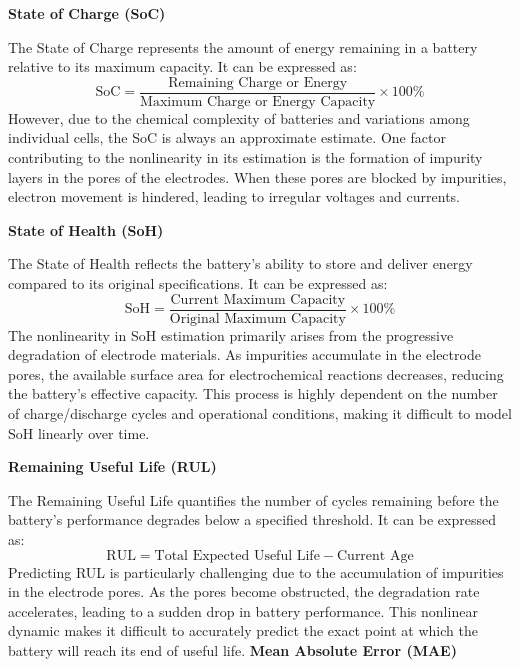 \textbf{State of Charge (SoC)}

The State of Charge represents the amount of energy remaining in a battery relative to its maximum capacity. It can be expressed as:
\begin{equation}
\text{SoC} = \frac{\text{Remaining Charge or Energy}}{\text{Maximum Charge or Energy Capacity}} \times 100\%
\end{equation}
However, due to the chemical complexity of batteries and variations among individual cells, the SoC is always an approximate estimate. One factor contributing to the nonlinearity in its estimation is the formation of impurity layers in the pores of the electrodes. When these pores are blocked by impurities, electron movement is hindered, leading to irregular voltages and currents.

\textbf{State of Health (SoH)}

The State of Health reflects the battery's ability to store and deliver energy compared to its original specifications. It can be expressed as:
\begin{equation}
\text{SoH} = \frac{\text{Current Maximum Capacity}}{\text{Original Maximum Capacity}} \times 100\%
\end{equation}
The nonlinearity in SoH estimation primarily arises from the progressive degradation of electrode materials. As impurities accumulate in the electrode pores, the available surface area for electrochemical reactions decreases, reducing the battery's effective capacity. This process is highly dependent on the number of charge/discharge cycles and operational conditions, making it difficult to model SoH linearly over time.

\textbf{Remaining Useful Life (RUL)}

The Remaining Useful Life quantifies the number of cycles remaining before the battery's performance degrades below a specified threshold. It can be expressed as:
\begin{equation}
\text{RUL} = \text{Total Expected Useful Life} - \text{Current Age}
\end{equation}
Predicting RUL is particularly challenging due to the accumulation of impurities in the electrode pores. As the pores become obstructed, the degradation rate accelerates, leading to a sudden drop in battery performance. This nonlinear dynamic makes it difficult to accurately predict the exact point at which the battery will reach its end of useful life.
\textbf{Mean Absolute Error (MAE)}

